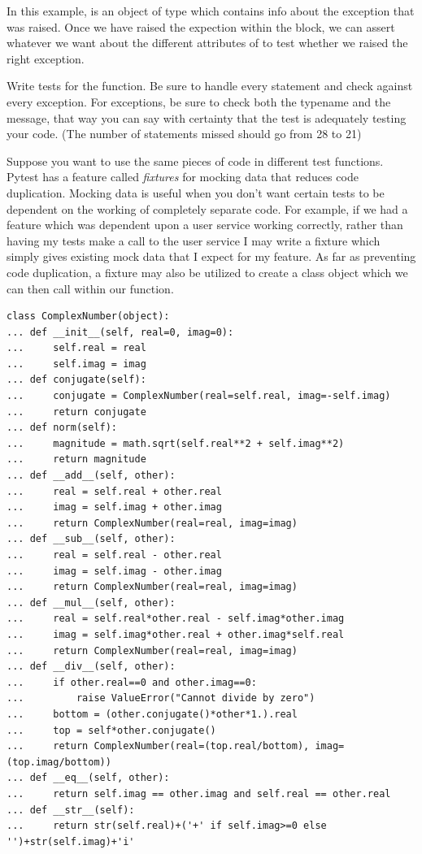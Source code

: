 In this example,  is an object of type  which contains info about the exception that was raised.  Once we have raised the expection within the  block, we can assert whatever we want about the different attributes of  to test whether we raised the right exception.

\begin{problem}
Write tests for the  function.
Be sure to handle every statement and check against every exception.
For exceptions, be sure to check both the typename and the message, that way you can say with certainty that the test is adequately testing your code.
(The number of statements missed should go from 28 to 21)
\end{problem}

Suppose you want to use the same pieces of code in different test functions. Pytest has a feature called \emph{fixtures} for mocking data that reduces code duplication.
Mocking data is useful when you don't want certain tests to be dependent on the working of completely separate code.
For example, if we had a feature which was dependent upon a user service working correctly, rather than having my tests make a call to the user service I may write a fixture which simply gives existing mock data that I expect for my feature.
As far as preventing code duplication, a fixture may also be utilized to create a class object which we can then call within our function.

\begin{lstlisting}
class ComplexNumber(object):
... def __init__(self, real=0, imag=0):
...     self.real = real
...     self.imag = imag
... def conjugate(self):
...     conjugate = ComplexNumber(real=self.real, imag=-self.imag)
...     return conjugate
... def norm(self):
...     magnitude = math.sqrt(self.real**2 + self.imag**2)
...     return magnitude
... def __add__(self, other):
...     real = self.real + other.real
...     imag = self.imag + other.imag
...     return ComplexNumber(real=real, imag=imag)
... def __sub__(self, other):
...     real = self.real - other.real
...     imag = self.imag - other.imag
...     return ComplexNumber(real=real, imag=imag)
... def __mul__(self, other):
...     real = self.real*other.real - self.imag*other.imag
...     imag = self.imag*other.real + other.imag*self.real
...     return ComplexNumber(real=real, imag=imag)
... def __div__(self, other):
...     if other.real==0 and other.imag==0:
...         raise ValueError("Cannot divide by zero")
...     bottom = (other.conjugate()*other*1.).real
...     top = self*other.conjugate()
...     return ComplexNumber(real=(top.real/bottom), imag=(top.imag/bottom))
... def __eq__(self, other):
...     return self.imag == other.imag and self.real == other.real
... def __str__(self):
...     return str(self.real)+('+' if self.imag>=0 else '')+str(self.imag)+'i'
\end{lstlisting}


